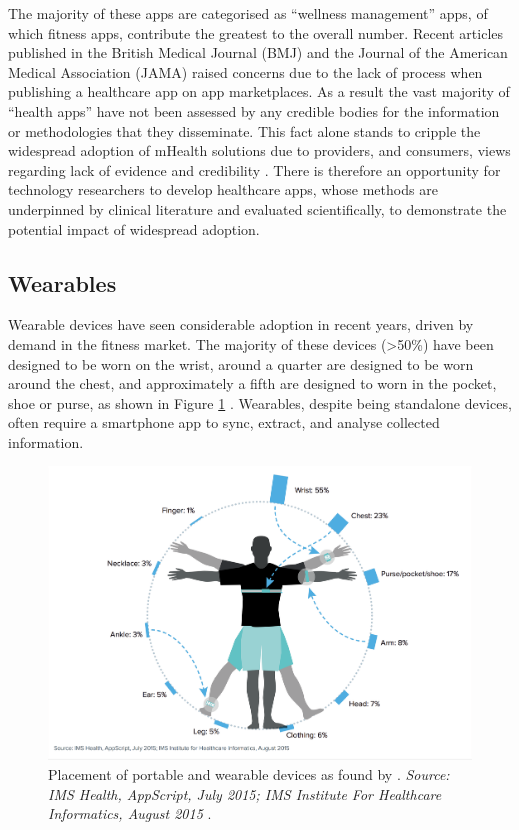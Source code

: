 The majority of these apps are categorised as ``wellness management'' apps, of which fitness apps, contribute the greatest to the overall number. Recent articles published in the British Medical Journal (BMJ) \cite{Husain2015} and the Journal of the American Medical Association (JAMA) \cite{Kuehn2015} raised concerns due to the lack of process when publishing a healthcare app on app marketplaces. As a result the vast majority of ``health apps'' have not been assessed by any credible bodies for the information or methodologies that they disseminate. This fact alone stands to cripple the widespread adoption of mHealth solutions due to providers, and consumers, views regarding lack of evidence and credibility \cite{IMSmHealth2015}. There is therefore an opportunity for technology researchers to develop healthcare apps, whose methods are underpinned by clinical literature and evaluated scientifically, to demonstrate the potential impact of widespread adoption.

\subsection{Wearables}
Wearable devices have seen considerable adoption in recent years, driven by demand in the fitness market. The majority of these devices (\textgreater50\%) have been designed to be worn on the wrist, around a quarter are designed to be worn around the chest, and approximately a fifth are designed to worn in the pocket, shoe or purse, as shown in Figure \ref{fig: imshealth-wearableposition} \cite{IMSmHealth2015}. Wearables, despite being standalone devices, often require a smartphone app to sync, extract, and analyse collected information.

\begin{figure}[h]
    \centering
    \includegraphics[scale=0.2, angle=0]{Files/literature-review/figures/imshealth-wearableposition}
    \caption{Placement of portable and wearable devices as found by \citeauthor{IMSmHealth2015}. \textit{Source: IMS Health, AppScript, July 2015; IMS Institute For Healthcare Informatics, August 2015} \cite{IMSmHealth2015}.}
    \label{fig: imshealth-wearableposition}
\end{figure}

